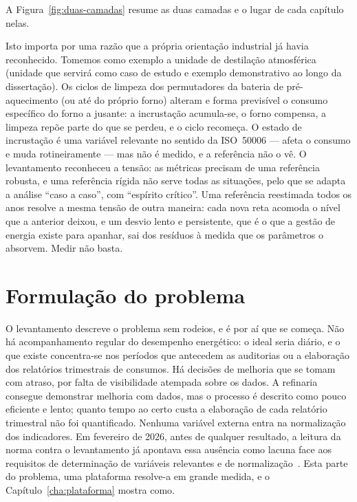 A Figura~\ref{fig:duas-camadas} resume as duas camadas e o lugar de cada capítulo nelas.



Isto importa por uma razão que a própria orientação industrial
já havia reconhecido. Tomemos como exemplo a unidade de destilação atmosférica (unidade que servirá como caso de estudo e exemplo demonstrativo ao longo da dissertação). Os ciclos de limpeza dos permutadores da bateria de
pré-aquecimento (ou até do próprio forno) alteram e forma previsível o consumo específico do forno
a jusante: a incrustação acumula-se, o forno compensa, a limpeza repõe
parte do que se perdeu, e o ciclo recomeça. O estado de incrustação é uma
variável relevante no sentido da ISO~50006 --- afeta o consumo e muda
rotineiramente --- mas não é medido, e a referência não o vê. O
levantamento reconheceu a tensão: as métricas precisam de uma referência
robusta, e uma referência rígida não serve todas as situações, pelo que
se adapta a análise \enquote{caso a caso}, com \enquote{espírito
crítico}. Uma referência reestimada todos os anos resolve a mesma
tensão de outra maneira: cada nova reta acomoda o nível que a anterior
deixou, e um desvio lento e persistente, que é o que a gestão de energia
existe para apanhar, sai dos resíduos à medida que os parâmetros o
absorvem. Medir não basta.

\section{Formulação do problema}
\label{sec:problema}

O levantamento descreve o problema sem rodeios, e é por aí que se
começa. Não há acompanhamento regular do desempenho energético: o ideal
seria diário, e o que existe concentra-se nos períodos que antecedem as
auditorias ou a elaboração dos relatórios trimestrais de consumos. Há decisões de melhoria que se tomam com atraso, por falta de
visibilidade atempada sobre os dados. A refinaria consegue demonstrar
melhoria com dados, mas o processo é descrito como pouco eficiente e
lento; quanto tempo ao certo custa a elaboração de cada relatório trimestral não foi
quantificado. Nenhuma variável externa
entra na normalização dos indicadores. Em fevereiro de 2026, antes de
qualquer resultado, a leitura da norma contra o levantamento já apontava
essa ausência como lacuna face aos requisitos de determinação de
variáveis relevantes e de normalização~\cite[\S6.4--6.5]{ISO50001_2018}.
Esta parte do problema, uma plataforma resolve-a em grande medida, e o
Capítulo~\ref{cha:plataforma} mostra como.

